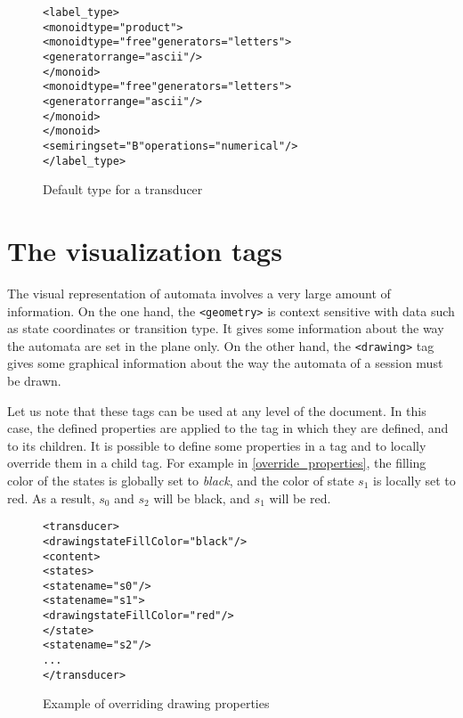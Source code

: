 \documentclass[a4paper]{article}
\def\geometrytag{\texttt{<geometry>}}
\def\drawingtag{\texttt{<drawing>}}
\begin{document}
\begin{figure}[h]
  \begin{center}
\begin{alltt}
<label_type>
  <monoid type="product">
     <monoid type="free" generators="letters">
       <generator range="ascii"/>
     </monoid>
     <monoid type="free" generators="letters">
       <generator range="ascii"/>
     </monoid>
  </monoid>
  <semiring set="B" operations="numerical"/>
</label_type>
\end{alltt}

\caption{Default type for a transducer}
\label{transducertype}
  \end{center}
\end{figure}

\newpage
\section{The visualization tags}
\label{title_vizualisation}
The visual representation of automata involves a very large amount of
information. On the one hand, the \geometrytag{} is context sensitive
with data such as state coordinates or transition type. It gives some
information about the way the automata are set in the plane only.  On
the other hand, the \drawingtag{} tag gives some graphical information
about the way the automata of a session must be drawn.

Let us note that these tags can be used at any level of the document. In this
case, the defined properties are applied to the tag in which they are defined,
and to its children. It is possible to define some properties in a tag and to
locally override them in a child tag. For example in
\autoref{override_properties}, the filling color of the states is
globally set to
\textit{black}, and the color of state $s_1$ is locally set to red. As a
result, $s_0$ and $s_2$ will be black, and $s_1$ will be red.

{\small
\begin{figure}[h]
  \begin{center}
\begin{alltt}
<transducer>
  <drawing stateFillColor="black"/>
  <content>
     <states>
        <state name="s0"/>
        <state name="s1">
            <drawing stateFillColor="red"/>
        </state>
        <state name="s2"/>
      ...
</transducer>
\end{alltt}

\caption{Example of overriding drawing properties}
\label{override_properties}
  \end{center}
\end{figure}
}
\end{document}
